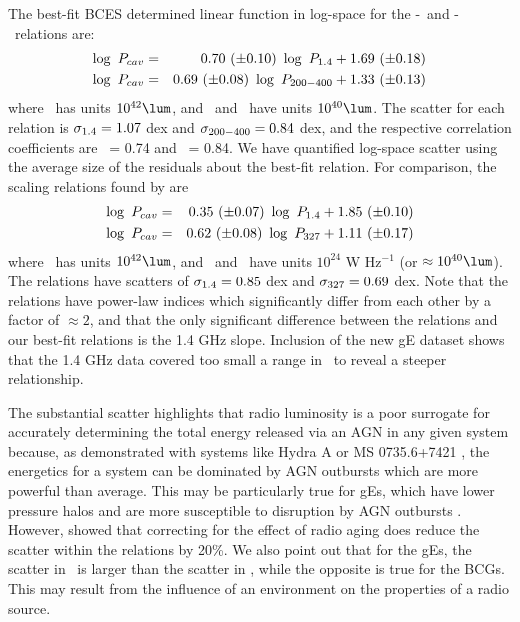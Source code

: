 \documentclass{emulateapj}
\begin{document}
The best-fit BCES determined linear function in log-space for the
\pcav-\phigh\ and \pcav-\plow\ relations are:
\begin{eqnarray}
  \log~P_{cav} &=& 0.70~(\pm 0.10)~\log~P_{\mathrm{1.4}} + 1.69~(\pm 0.18)\\
  \log~P_{cav} &=& 0.69~(\pm 0.08)~\log~P_{\mathrm{200-400}} + 1.33~(\pm 0.13)
\end{eqnarray}
where \pcav\ has units $10^{42} \lum$, and \phigh\ and \plow\ have
units $10^{40} \lum$. The scatter for each relation is $\sigma_{\mathrm{1.4}} = 1.07$
dex and $\sigma_{\mathrm{200-400}} = 0.84$ dex, and the respective correlation
coefficients are \rhigh\ = 0.74 and \rlow\ = 0.84. We have quantified
log-space scatter using the average size of the residuals about the
best-fit relation. For comparison, the scaling relations found by
\citet{birzan08} are
\begin{eqnarray}
  \log~P_{cav} &=& 0.35~(\pm 0.07)~\log~P_{\mathrm{1.4}} + 1.85~(\pm 0.10)\\
  \log~P_{cav} &=& 0.62~(\pm 0.08)~\log~P_{\mathrm{327}} + 1.11~(\pm 0.17)
\end{eqnarray}
where \pcav\ has units $10^{42} \lum$, and \phigh\ and \pthree\ have
units $10^{24}$ W Hz$^{-1}$ (or $\approx 10^{40} \lum$). The relations
have scatters of $\sigma_{\mathrm{1.4}} = 0.85$ dex and $\sigma_{\mathrm{327}} = 0.69$ dex. Note
that the \citet{birzan08} relations have power-law indices which
significantly differ from each other by a factor of $\approx 2$, and
that the only significant difference between the \citet{birzan08}
relations and our best-fit relations is the 1.4 GHz slope. Inclusion
of the new gE dataset shows that the \citet{birzan08} 1.4 GHz data
covered too small a range in \pcav\ to reveal a steeper relationship.

The substantial scatter highlights that radio luminosity is a poor
surrogate for accurately determining the total energy released via an
AGN in any given system because, as demonstrated with systems like
Hydra A \citep{hydraa} or MS 0735.6+7421 \citep{ms0735}, the
energetics for a system can be dominated by AGN outbursts which are
more powerful than average. This may be particularly true for gEs,
which have lower pressure halos and are more susceptible to disruption
by AGN outbursts \citep{2006MNRAS.372.1161W, 2008ApJ...687L..53P}.
However, \citet{birzan08} showed that correcting for the effect of
radio aging does reduce the scatter within the relations by 20\%. We
also point out that for the gEs, the scatter in \prad\ is larger than
the scatter in \pcav, while the opposite is true for the BCGs. This
may result from the influence of an environment on the properties of a
radio source.
\end{document}
